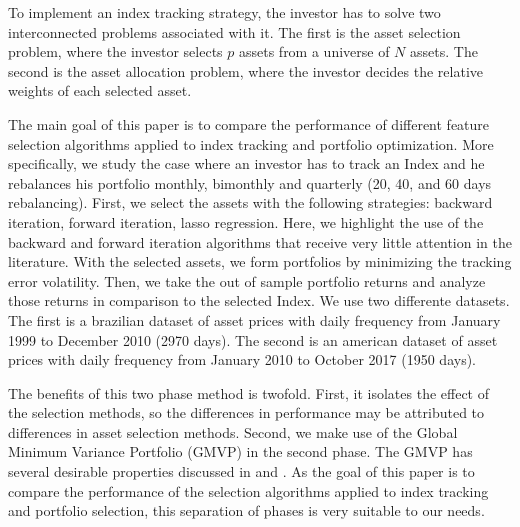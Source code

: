 \documentclass[preprint, doubleblind, authoryear,10pt]{elsarticle}
\begin{document}
To implement an index tracking strategy, the investor has to solve two interconnected problems associated with it.
The first is the asset selection problem, where the investor selects $p$ assets from a universe of $N$ assets.
The second is the asset allocation problem, where the investor decides the relative weights of each selected asset.


The main goal of this paper is to compare the performance of different feature selection algorithms applied to index tracking and portfolio optimization.
More specifically, we study the case where an investor has to track an Index and he rebalances his portfolio monthly, bimonthly and quarterly (20, 40, and 60 days rebalancing).
First, we select the assets with the following strategies:
backward iteration, forward iteration, lasso regression.
Here, we highlight the use of the backward and forward iteration algorithms that receive very little attention in the literature.
With the selected assets, we form portfolios by minimizing the tracking error volatility.
Then, we take the out of sample portfolio returns and analyze those returns in comparison to the selected Index.
We use two differente datasets.
The first is a brazilian dataset of asset prices with daily frequency from January 1999 to December 2010 (2970 days).
The second is an american dataset of asset prices with daily frequency from January 2010 to October 2017 (1950 days).

The benefits of this two phase method is twofold.
First, it isolates the effect of the selection methods, so the differences in performance may be attributed to differences in asset selection methods.
Second, we make use of the Global Minimum Variance Portfolio (GMVP) in the second phase.
The GMVP has several desirable properties discussed in \cite{jag-2003} and \cite{CTS2006}.
As the goal of this paper is to compare the performance of the selection algorithms applied to index tracking and portfolio selection, this separation of phases is very suitable to our needs.

\end{document}
